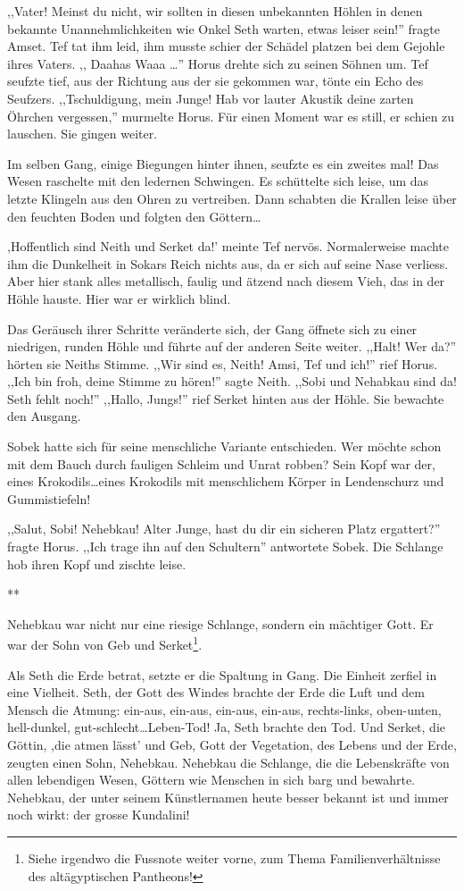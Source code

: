\documentclass[11pt,titlepage,a5paper]{book}
\newcommand{\sterne}{\par{\centering ***\par}}
\begin{document}
,,Vater! Meinst du nicht, wir sollten in diesen unbekannten Höhlen in denen bekannte Unannehmlichkeiten wie Onkel Seth warten, etwas leiser sein!'' fragte Amset. Tef tat ihm leid, ihm musste schier der Schädel platzen bei dem Gejohle ihres Vaters. ,, \eighthnote \twonotes{} Daahas Waaa\eighthnote \twonotes{} \dots '' Horus drehte sich zu seinen Söhnen um. Tef seufzte tief, aus der Richtung aus der sie gekommen war, tönte ein Echo des Seufzers. ,,Tschuldigung, mein Junge! Hab vor lauter Akustik deine zarten Öhrchen vergessen,'' murmelte Horus. Für einen Moment war es still, er schien zu lauschen. Sie gingen weiter.

Im selben Gang, einige Biegungen hinter ihnen, seufzte es ein zweites mal! Das Wesen raschelte mit den ledernen Schwingen. Es schüttelte sich leise, um das letzte Klingeln aus den Ohren zu vertreiben. Dann schabten die Krallen leise über den feuchten Boden und folgten den Göttern\dots 

,Hoffentlich sind Neith und Serket da!' meinte Tef nervös. Normalerweise machte ihm die Dunkelheit in Sokars Reich nichts aus, da er sich auf seine Nase verliess. Aber hier stank alles metallisch, faulig und ätzend nach diesem Vieh, das in der Höhle hauste. Hier war er wirklich blind.

Das Geräusch ihrer Schritte veränderte sich, der Gang öffnete sich zu einer niedrigen, runden Höhle und führte auf der anderen Seite weiter. ,,Halt! Wer da?'' hörten sie Neiths Stimme. ,,Wir sind es, Neith! Amsi, Tef und ich!'' rief Horus. ,,Ich bin froh, deine Stimme zu hören!'' sagte Neith. ,,Sobi und Nehabkau sind da! Seth fehlt noch!'' ,,Hallo, Jungs!'' rief Serket hinten aus der Höhle. Sie bewachte den Ausgang.

Sobek hatte sich für seine menschliche Variante entschieden. Wer möchte schon mit dem Bauch durch fauligen Schleim und Unrat robben? Sein Kopf war der, eines Krokodils\dots eines Krokodils mit menschlichem Körper in Lendenschurz und Gummistiefeln!
 
,,Salut, Sobi! Nehebkau! Alter Junge, hast du dir ein sicheren Platz ergattert?'' fragte Horus. ,,Ich trage ihn auf den Schultern'' antwortete Sobek. Die Schlange hob ihren Kopf und zischte leise. 

\sterne
Nehebkau war nicht nur eine riesige Schlange, sondern ein mächtiger Gott. Er war der Sohn von Geb und Serket\footnote{Siehe irgendwo die Fussnote weiter vorne, zum Thema Familienverhältnisse des altägyptischen Pantheons!}.

Als Seth die Erde betrat, setzte er die Spaltung in Gang. Die Einheit zerfiel in eine Vielheit. Seth, der Gott des Windes brachte der Erde die Luft und dem Mensch die Atmung: ein-aus, ein-aus, ein-aus, ein-aus, rechts-links, oben-unten, hell-dunkel, gut-schlecht\dots Leben-Tod! Ja, Seth brachte den Tod. Und Serket, die Göttin, ,die atmen lässt' und Geb, Gott der Vegetation, des Lebens und der Erde, zeugten einen Sohn, Nehebkau. Nehebkau die Schlange, die die Lebenskräfte von allen lebendigen Wesen, Göttern wie Menschen in sich barg und bewahrte. Nehebkau, der unter seinem  Künstlernamen heute besser bekannt ist und immer noch wirkt: der grosse Kundalini!
\end{document}

